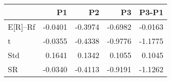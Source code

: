\begin{tabular}{lrrrr}
\toprule
 & P1 & P2 & P3 & P3-P1 \\
\midrule
E[R]--Rf & -0.0401 & -0.3974 & -0.6982 & -0.0163 \\
t & -0.0355 & -0.4338 & -0.9776 & -1.1775 \\
Std & 0.1641 & 0.1342 & 0.1055 & 0.1045 \\
SR & -0.0340 & -0.4113 & -0.9191 & -1.1262 \\
\bottomrule
\end{tabular}
